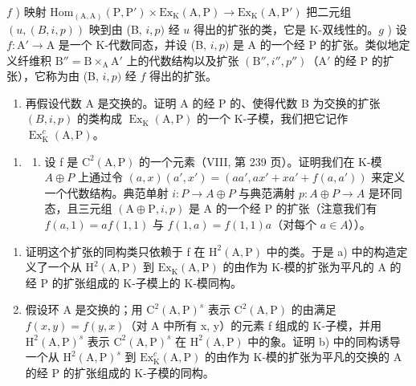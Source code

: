 \(f\) ) 映射 \(\mathrm{Hom}_{(\mathrm{A},\mathrm{A})}(\mathrm{P},\mathrm{P}')\times \mathrm{Ex}_\mathrm{K}(\mathrm{A},\mathrm{P})\to \mathrm{Ex}_\mathrm{K}(\mathrm{A},\mathrm{P}')\) 把二元组 \((u,(B,i,p))\) 映到由 (B, \(i,p)\) 经 \(u\) 得出的扩张的类，它是 K-双线性的。\(g\) ) 设 \(f:\mathrm{A}'\to \mathrm{A}\) 是一个 K-代数同态，并设 (B, \(i,p)\) 是 A 的一个经 P 的扩张。类似地定义纤维积 \(\mathrm{B}'' = \mathrm{B}\times_{\mathrm{A}}\mathrm{A}'\) 上的代数结构以及扩张 \((\mathrm{B}'' , i'', p'')\)（\(\mathrm{A}'\) 的经 P 的扩张），它称为由 (B, \(i,p)\) 经 \(f\) 得出的扩张。

\begin{enumerate}
\def\labelenumi{\alph{enumi})}
\setcounter{enumi}{7}
\tightlist
\item
  再假设代数 A 是交换的。证明 A 的经 P 的、使得代数 B 为交换的扩张 \((B,i,p)\) 的类构成 \(\operatorname{Ex}_{\mathrm{K}}(\mathrm{A},\mathrm{P})\) 的一个 K-子模，我们把它记作 \(\operatorname{Ex}_{\mathrm{K}}^{c}(\mathrm{A},\mathrm{P})\)。
\end{enumerate}

\begin{enumerate}
\def\labelenumi{\arabic{enumi})}
\setcounter{enumi}{10}
\tightlist
\item
  \begin{enumerate}
  \def\labelenumii{\alph{enumii})}
  \tightlist
  \item
    设 f 是 \(\mathrm{C}^{2}(\mathrm{A},\mathrm{P})\) 的一个元素（VIII, 第 239 页）。证明我们在 K-模 \(A \oplus P\) 上通过令 \((a,x)(a',x') = (aa',ax' + xa' + f(a,a'))\) 来定义一个代数结构。典范单射 \(i: P \to A \oplus P\) 与典范满射 \(p: A \oplus P \to A\) 是环同态，且三元组 \((\mathrm{A} \oplus \mathrm{P}, i, p)\) 是 A 的一个经 P 的扩张（注意我们有 \(f(a,1) = af(1,1)\) 与 \(f(1,a) = f(1,1)a\)（对每个 \(a \in A\)））。
  \end{enumerate}
\end{enumerate}

\begin{enumerate}
\def\labelenumi{\alph{enumi})}
\setcounter{enumi}{1}
\item
  证明这个扩张的同构类只依赖于 f 在 \(\mathrm{H}^{2}(\mathrm{A},\mathrm{P})\) 中的类。于是 a) 中的构造定义了一个从 \(\mathrm{H}^{2}(\mathrm{A},\mathrm{P})\) 到 \(\mathrm{Ex}_{\mathrm{K}}(\mathrm{A},\mathrm{P})\) 的由作为 K-模的扩张为平凡的 A 的经 P 的扩张组成的 K-子模上的 K-模同构。
\item
  假设环 A 是交换的；用 \(\mathrm{C}^{2}(\mathrm{A},\mathrm{P})^{s}\) 表示 \(\mathrm{C}^{2}(\mathrm{A},\mathrm{P})\) 的由满足 \(f(x,y)=f(y,x)\)（对 A 中所有 x, y）的元素 f 组成的 K-子模，并用 \(\mathrm{H}^{2}(\mathrm{A},\mathrm{P})^{s}\) 表示 \(\mathrm{C}^{2}(\mathrm{A},\mathrm{P})^{s}\) 在 \(\mathrm{H}^{2}(\mathrm{A},\mathrm{P})\) 中的象。证明 b) 中的同构诱导一个从 \(\mathrm{H}^{2}(\mathrm{A},\mathrm{P})^{s}\) 到 \(\mathrm{Ex}_{\mathrm{K}}^{c}(\mathrm{A},\mathrm{P})\) 的由作为 K-模的扩张为平凡的交换的 A 的经 P 的扩张组成的 K-子模的同构。
\end{enumerate}

